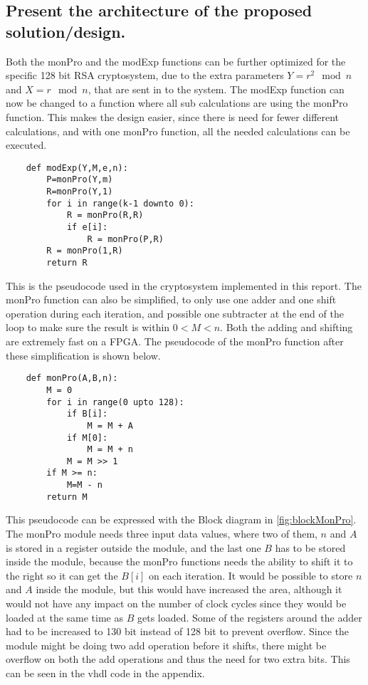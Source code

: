 \subsection{Present the architecture of the proposed solution/design.}
Both the monPro and the modExp functions can be further optimized for the specific 128 bit RSA cryptosystem, due to the extra parameters $Y=r^2 \mod{n}$ and $X=r\mod{n}$, that are sent in to the system. The modExp function can now be changed to a function where all sub calculations are using the monPro function. This makes the design easier, since there is need for fewer different calculations, and with one monPro function, all the needed calculations can be executed.
\begin{lstlisting}
    def modExp(Y,M,e,n):
        P=monPro(Y,m)
        R=monPro(Y,1)
        for i in range(k-1 downto 0):
            R = monPro(R,R)
            if e[i]:
                R = monPro(P,R)
        R = monPro(1,R)
        return R
\end{lstlisting}
This is the pseudocode used in the cryptosystem implemented in this report. The monPro function can also be simplified, to only use one adder and one shift operation during each iteration, and possible one subtracter at the end of the loop to make sure the result is within $0<M<n$. Both the adding and shifting are extremely fast on a FPGA. The pseudocode of the monPro function after these simplification is shown below.
\begin{lstlisting}
    def monPro(A,B,n):
        M = 0 
        for i in range(0 upto 128):
            if B[i]:
                M = M + A 
            if M[0]:
                M = M + n 
            M = M >> 1
        if M >= n:
            M=M - n
        return M
\end{lstlisting}
This pseudocode can be expressed with the Block diagram in \cref{fig:blockMonPro}. The monPro module needs three input data values, where two of them, $n$ and $A$ is stored in a register outside the module, and the last one $B$ has to be stored inside the module, because the monPro functions needs the ability to shift it to the right so it can get the $B[i]$ on each iteration. It would be possible to store $n$ and $A$ inside the module, but this would have increased the area, although it would not have any impact on the number of clock cycles since they would be loaded at the same time as $B$ gets loaded. Some of the registers around the adder had to be increased to 130 bit instead of 128 bit to prevent overflow. Since the module might be doing two add operation before it shifts, there might be overflow on both the add operations and thus the need for two extra bits. This can be seen in the vhdl code in the appendix.


